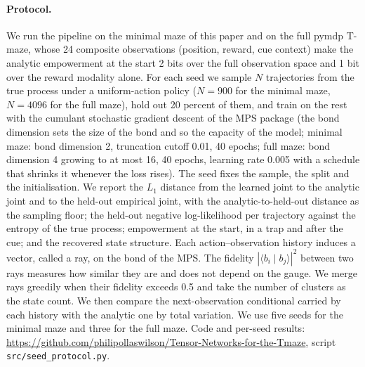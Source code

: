 \documentclass[letterpaper]{article} %
\theoremstyle{definition}
\begin{document}
\paragraph{Protocol.} We run the pipeline on the minimal maze of this paper and on the full pymdp T-maze, whose 24 composite observations (position, reward, cue context) make the analytic empowerment at the start 2 bits over the full observation space and 1 bit over the reward modality alone. For each seed we sample $N$ trajectories from the true process under a uniform-action policy ($N = 900$ for the minimal maze, $N = 4096$ for the full maze), hold out 20 percent of them, and train on the rest with the cumulant stochastic gradient descent of the MPS package (the bond dimension sets the size of the bond and so the capacity of the model; minimal maze: bond dimension 2, truncation cutoff 0.01, 40 epochs; full maze: bond dimension 4 growing to at most 16, 40 epochs, learning rate 0.005 with a schedule that shrinks it whenever the loss rises). The seed fixes the sample, the split and the initialisation. We report the $L_1$ distance from the learned joint to the analytic joint and to the held-out empirical joint, with the analytic-to-held-out distance as the sampling floor; the held-out negative log-likelihood per trajectory against the entropy of the true process; empowerment at the start, in a trap and after the cue; and the recovered state structure. Each action--observation history induces a vector, called a ray, on the bond of the MPS. The fidelity $|\langle b_i \mid b_j \rangle|^2$ between two rays measures how similar they are and does not depend on the gauge. We merge rays greedily when their fidelity exceeds 0.5 and take the number of clusters as the state count. We then compare the next-observation conditional carried by each history with the analytic one by total variation. We use five seeds for the minimal maze and three for the full maze. Code and per-seed results: \url{https://github.com/philipollaswilson/Tensor-Networks-for-the-Tmaze}, script \texttt{src/seed\_protocol.py}.
\end{document}
